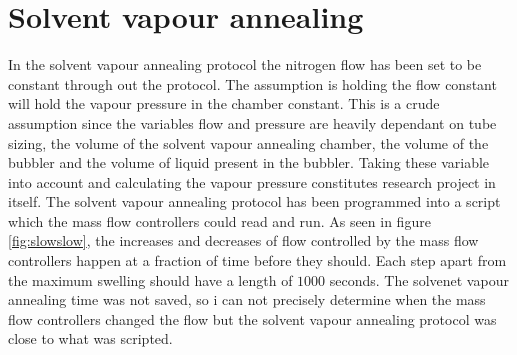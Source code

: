 \documentclass[MasterThesisMain.tex]{subfiles}
\begin{document}
\section{Solvent vapour annealing}
In the solvent vapour annealing protocol the nitrogen flow has been set to be constant through out the protocol. The assumption is holding the flow constant will hold the vapour pressure in the chamber constant. This is a crude assumption since the variables flow and pressure are heavily dependant on tube sizing, the volume of the solvent vapour annealing chamber, the volume of the bubbler and the volume of liquid present in the bubbler. Taking these variable into account and calculating the vapour pressure constitutes research project in itself. The solvent vapour annealing protocol has been programmed into a script which the mass flow controllers could read and run. As seen in figure \ref{fig:slowslow}, the increases and decreases of flow controlled by the mass flow controllers happen at a fraction of time before they should. Each step apart from the maximum swelling should have a length of $1000$ seconds. The solvenet vapour annealing time was not saved, so i can not precisely determine when the mass flow controllers changed the flow but the solvent vapour annealing protocol was close to what was scripted.   
\end{document}
